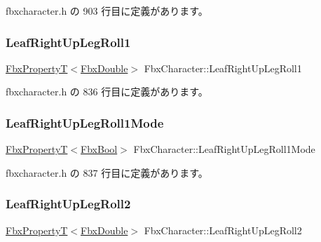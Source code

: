  fbxcharacter.\+h の 903 行目に定義があります。

\mbox{\label{class_fbx_character_a953eee696f80e4e09e25e0e43b120935}} 
\subsubsection{\texorpdfstring{Leaf\+Right\+Up\+Leg\+Roll1}{LeafRightUpLegRoll1}}
{\footnotesize\ttfamily \hyperlink{class_fbx_property_t}{Fbx\+PropertyT}$<$\hyperlink{fbxtypes_8h_a171e72a1c46fc15c1a6c9c31948c1c5b}{Fbx\+Double}$>$ Fbx\+Character\+::\+Leaf\+Right\+Up\+Leg\+Roll1}



 fbxcharacter.\+h の 836 行目に定義があります。

\mbox{\label{class_fbx_character_a3dd0e08f6023f75e7cddf7bf256925d5}} 
\subsubsection{\texorpdfstring{Leaf\+Right\+Up\+Leg\+Roll1\+Mode}{LeafRightUpLegRoll1Mode}}
{\footnotesize\ttfamily \hyperlink{class_fbx_property_t}{Fbx\+PropertyT}$<$\hyperlink{fbxtypes_8h_a92e0562b2fe33e76a242f498b362262e}{Fbx\+Bool}$>$ Fbx\+Character\+::\+Leaf\+Right\+Up\+Leg\+Roll1\+Mode}



 fbxcharacter.\+h の 837 行目に定義があります。

\mbox{\label{class_fbx_character_a2fd8fc9434a1d6fe17374b5364970df8}} 
\subsubsection{\texorpdfstring{Leaf\+Right\+Up\+Leg\+Roll2}{LeafRightUpLegRoll2}}
{\footnotesize\ttfamily \hyperlink{class_fbx_property_t}{Fbx\+PropertyT}$<$\hyperlink{fbxtypes_8h_a171e72a1c46fc15c1a6c9c31948c1c5b}{Fbx\+Double}$>$ Fbx\+Character\+::\+Leaf\+Right\+Up\+Leg\+Roll2}



